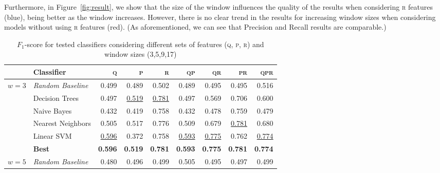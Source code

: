\documentclass[runningheads]{llncs}
\begin{document}
Furthermore, in Figure~\ref{fig:result}, we show that the size of the window influences the quality of the results when considering \textsc{r} features (blue), being better as the window increases. However, there is no clear trend in the results for increasing window sizes when considering models without using \textsc{r} features (red). (As aforementioned, we can see that Precision and Recall results are comparable.) 

\begin{table*}[t]
	\centering
	\caption{$F_1$-score for tested classifiers considering different sets of features (\textsc{q}, \textsc{p}, \textsc{r}) and window sizes (3,5,9,17)}
	\label{tab:classifier}
	\begin{tabular}{l@{\hskip 0.1in}l@{\hskip 0.1in}r@{\hskip 0.1in}r@{\hskip 0.1in}r@{\hskip 0.1in}r@{\hskip 0.1in}r@{\hskip 0.1in}r@{\hskip 0.1in}r}    \toprule		  
		& \textbf{Classifier}        & \textsc{q}         & \textsc{p}         & \textsc{r}         & \textsc{qp}        & \textsc{qr}        & \textsc{pr}        & \textsc{qpr}       \\    \midrule
	$w=3$ 	& \textit{Random Baseline} & 0.499          & 0.489          & 0.502          & 0.489          & 0.495          & 0.495          & 0.516          \\
		& Decision Trees           & 0.497          & \underline{0.519}    & \underline{0.781}    & 0.497          & 0.569          & 0.706          & 0.600            \\
		& Naive Bayes              & 0.432          & 0.419          & 0.758          & 0.432          & 0.478          & 0.759          & 0.479          \\
		& Nearest Neighbors        & 0.505          & 0.517          & 0.776          & 0.509          & 0.679          & \underline{0.781}    & 0.680           \\
		& Linear SVM               & \underline{0.596}    & 0.372          & 0.758          & \underline{0.593}    & \underline{0.775}    & 0.762          & \underline{0.774}    \\    \midrule
		& \textbf{Best}          & \textbf{0.596} & \textbf{0.519} & \textbf{0.781} & \textbf{0.593} & \textbf{0.775} & \textbf{0.781} & \textbf{0.774} \\    \midrule
	$w=5$	& \textit{Random Baseline} & 0.480           & 0.496          & 0.499          & 0.505          & 0.495          & 0.497          & 0.499          \\

\end{tabular}
\end{table*}
\end{document}
